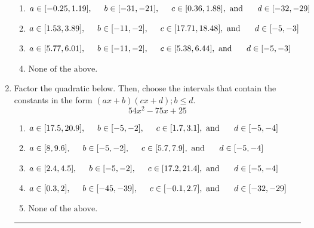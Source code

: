 \documentclass[14pt]{extbook}
\newcommand{\litem}[1]{\item#1\hspace*{-1cm}\rule{\textwidth}{0.4pt}}
\begin{document}
\begin{enumerate}
{\begin{enumerate}[label=\Alph*.]
\item \( a \in [-0.25, 1.19], \hspace*{5mm} b \in [-31, -21], \hspace*{5mm} c \in [0.36, 1.88], \text{ and } \hspace*{5mm} d \in [-32, -29] \)
\item \( a \in [1.53, 3.89], \hspace*{5mm} b \in [-11, -2], \hspace*{5mm} c \in [17.71, 18.48], \text{ and } \hspace*{5mm} d \in [-5, -3] \)
\item \( a \in [5.77, 6.01], \hspace*{5mm} b \in [-11, -2], \hspace*{5mm} c \in [5.38, 6.44], \text{ and } \hspace*{5mm} d \in [-5, -3] \)
\item \( \text{None of the above.} \)

\end{enumerate} }
\litem{
Factor the quadratic below. Then, choose the intervals that contain the constants in the form $(ax+b)(cx+d); b \leq d.$\[ 54x^{2} -75 x + 25 \]\begin{enumerate}[label=\Alph*.]
\item \( a \in [17.5, 20.9], \hspace*{5mm} b \in [-5, -2], \hspace*{5mm} c \in [1.7, 3.1], \text{ and } \hspace*{5mm} d \in [-5, -4] \)
\item \( a \in [8, 9.6], \hspace*{5mm} b \in [-5, -2], \hspace*{5mm} c \in [5.7, 7.9], \text{ and } \hspace*{5mm} d \in [-5, -4] \)
\item \( a \in [2.4, 4.5], \hspace*{5mm} b \in [-5, -2], \hspace*{5mm} c \in [17.2, 21.4], \text{ and } \hspace*{5mm} d \in [-5, -4] \)
\item \( a \in [0.3, 2], \hspace*{5mm} b \in [-45, -39], \hspace*{5mm} c \in [-0.1, 2.7], \text{ and } \hspace*{5mm} d \in [-32, -29] \)
\item \( \text{None of the above.} \)


\end{enumerate}}
\end{enumerate}
\end{document}
